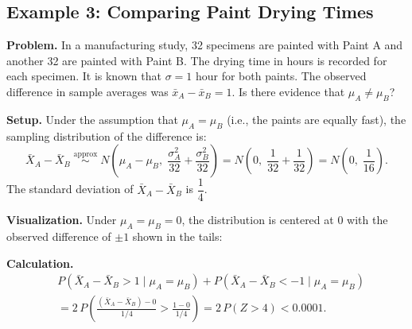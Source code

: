 \documentclass[10pt]{report}
\begin{document}
\subsection{Example 3: Comparing Paint Drying Times}

\textbf{Problem.} In a manufacturing study, 32 specimens are painted with Paint A and another 32 are painted with Paint B. The drying time in hours is recorded for each specimen. It is known that $\sigma = 1$ hour for both paints. The observed difference in sample averages was $\bar{x}_A - \bar{x}_B = 1$. Is there evidence that $\mu_A \neq \mu_B$?

\textbf{Setup.} Under the assumption that $\mu_A = \mu_B$ (i.e., the paints are equally fast), the sampling distribution of the difference is:
\[
\bar{X}_A - \bar{X}_B \;\overset{\text{approx}}{\sim}\; N\!\left(\mu_A - \mu_B,\; \frac{\sigma_A^2}{32} + \frac{\sigma_B^2}{32}\right) = N\!\left(0,\; \frac{1}{32} + \frac{1}{32}\right) = N\!\left(0,\; \frac{1}{16}\right).
\]
The standard deviation of $\bar{X}_A - \bar{X}_B$ is $\dfrac{1}{4}$.

\textbf{Visualization.} Under $\mu_A = \mu_B = 0$, the distribution is centered at 0 with the observed difference of $\pm 1$ shown in the tails:

\begin{center}
\end{center}

\textbf{Calculation.}
\begin{align*}
&P\!\left(\bar{X}_A - \bar{X}_B > 1 \;\Big|\; \mu_A = \mu_B\right) + P\!\left(\bar{X}_A - \bar{X}_B < -1 \;\Big|\; \mu_A = \mu_B\right) \\
&= 2\,P\!\left(\frac{(\bar{X}_A - \bar{X}_B) - 0}{1/4} > \frac{1 - 0}{1/4}\right)
= 2\,P(Z > 4) < 0.0001.
\end{align*}
\end{document}
